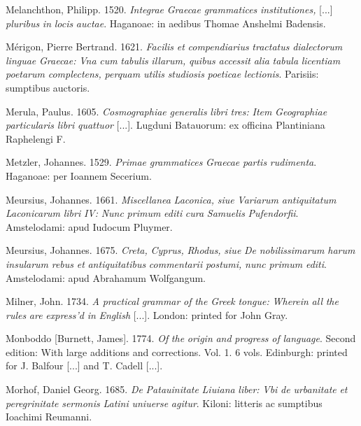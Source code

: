 \documentclass[output=paper]{langsci/langscibook}
\begin{document}
Melanchthon, Philipp. 1520. \textit{Integrae} \textit{Graecae} \textit{grammatices} \textit{institutiones,} [...] \textit{pluribus} \textit{in} \textit{locis} \textit{auctae}. Haganoae: in aedibus Thomae Anshelmi Badensis.

Mérigon, Pierre Bertrand. 1621. \textit{Facilis} \textit{et} \textit{compendiarius} \textit{tractatus} \textit{dialectorum} \textit{linguae} \textit{Graecae:} \textit{Vna} \textit{cum} \textit{tabulis} \textit{illarum,} \textit{quibus} \textit{accessit} \textit{alia} \textit{tabula} \textit{licentiam} \textit{poetarum} \textit{complectens,} \textit{perquam} \textit{utilis} \textit{studiosis} \textit{poeticae} \textit{lectionis}. Parisiis: sumptibus auctoris.

Merula, Paulus. 1605. \textit{Cosmographiae} \textit{generalis} \textit{libri} \textit{tres:} \textit{Item} \textit{Geographiae} \textit{particularis} \textit{libri} \textit{quattuor} [...]. Lugduni Batauorum: ex officina Plantiniana Raphelengi F.

Metzler, Johannes. 1529. \textit{Primae} \textit{grammatices} \textit{Graecae} \textit{partis} \textit{rudimenta}. Haganoae: per Ioannem Secerium.

Meursius, Johannes. 1661. \textit{Miscellanea} \textit{Laconica,} \textit{siue} \textit{Variarum} \textit{antiquitatum} \textit{Laconicarum} \textit{libri} \textit{IV:} \textit{Nunc} \textit{primum} \textit{editi} \textit{cura} \textit{Samuelis} \textit{Pufendorfii}. Amstelodami: apud Iudocum Pluymer.

Meursius, Johannes. 1675. \textit{Creta,} \textit{Cyprus,} \textit{Rhodus,} \textit{siue} \textit{De} \textit{nobilissimarum} \textit{harum} \textit{insularum} \textit{rebus} \textit{et} \textit{antiquitatibus} \textit{commentarii} \textit{postumi,} \textit{nunc} \textit{primum} \textit{editi}. Amstelodami: apud Abrahamum Wolfgangum.

Milner, John. 1734. \textit{A} \textit{practical} \textit{grammar} \textit{of} \textit{the} \textit{Greek} \textit{tongue:} \textit{Wherein} \textit{all} \textit{the} \textit{rules} \textit{are} \textit{express’d} \textit{in} \textit{English} [...]. London: printed for John Gray.

Monboddo [Burnett, James]. 1774. \textit{Of} \textit{the} \textit{origin} \textit{and} \textit{progress} \textit{of} \textit{language}. Second edition: With large additions and corrections. Vol. 1. 6 vols. Edinburgh: printed for J. Balfour [...] and T. Cadell [...].

Morhof, Daniel Georg. 1685. \textit{De} \textit{Patauinitate} \textit{Liuiana} \textit{liber:} \textit{Vbi} \textit{de} \textit{urbanitate} \textit{et} \textit{peregrinitate} \textit{sermonis} \textit{Latini} \textit{uniuerse} \textit{agitur}. Kiloni: litteris ac sumptibus Ioachimi Reumanni.
\end{document}
